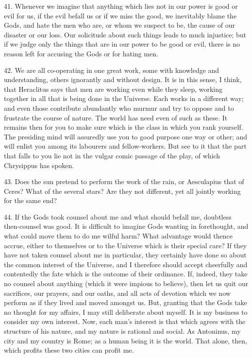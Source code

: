 \documentclass{book}
\begin{document}
41. Whenever we imagine that anything which lies not in our power is
good or evil for us, if the evil befall us or if we miss the good, we
inevitably blame the Gods, and hate the men who are, or whom we
suspect to be, the cause of our disaster or our loss. Our solicitude
about such things leads to much injustice; but if we judge only the
things that are in our power to be good or evil, there is no reason
left for accusing the Gods or for hating men.

42. We are all co-operating in one great work, some with knowledge and
understanding, others ignorantly and without design. It is in this
sense, I think, that Heraclitus says that men are working even while
they sleep, working together in all that is being done in the
Universe. Each works in a different way; and even those contribute
abundantly who murmur and try to oppose and to frustrate the course of
nature. The world has need even of such as these. It remains then for
you to make sure which is the class in which you rank yourself. The
presiding mind will assuredly use you to good purpose one way or
other; and will enlist you among its labourers and fellow-workers. But
see to it that the part that falls to you lie not in the vulgar comic
passage of the play, of which Chrysippus has spoken.

43. Does the sun pretend to perform the work of the rain, or
Aesculapius that of Ceres? What of the several stars? Are they not
different, yet all jointly working for the same end?

44. If the Gods took counsel about me and what should befall me,
doubtless then-counsel was good. It is difficult to imagine Gods
wanting in forethought, and what could move them to do me wilful harm?
What advantage would thence accrue, either to themselves or to the
Universe which is their special care? If they have not taken counsel
about me in particular, they certainly have done so about the common
interest of the Universe, and I therefore should accept cheerfully and
contentedly the fate which is the outcome of their ordinance. If,
indeed, they take no counsel about anything (which it were impious to
believe), then let us quit our sacrifices, our prayers, and our oaths,
and all acts of devotion which we now perform as if they lived and
moved amongst us. But, granting that the Gods take no thought for my
affairs, I may still deliberate about myself. It is my business to
consider my own interest. Now, each man's interest is that which
agrees with the structure of his nature, and my nature is rational and
social. As Antoninus, my city and my country is Rome; as a human being
it is the world. That alone, then, which profits these two cities can
profit me.
\end{document}
